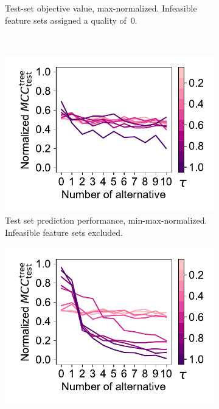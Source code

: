 \documentclass{article}
\theoremstyle{definition}
\begin{document}
\begin{figure}[p]
\begin{subfigure}[t]{0.48\textwidth}
		\caption{
			Test-set objective value, max-norma\-lized.
			Infeasible feature sets assigned a quality of~0.
		}
		\label{fig:afs:impact-num-alternatives-tau-test-objective-max-fillna}
	\end{subfigure}
	\\ \vspace{\baselineskip}
	\begin{subfigure}[t]{0.48\textwidth}
		\centering
		\includegraphics[width=\textwidth, trim=15 15 10 15, clip]{plots/afs-impact-num-alternatives-tau-decision-tree-test-mcc-min-max.pdf}
		\caption{
			Test set prediction performance, min-max-normalized.
			Infeasible feature sets excluded.
		}
		\label{fig:afs:impact-num-alternatives-tau-decision-tree-test-mcc-min-max}
	\end{subfigure}
	\hfill
	\begin{subfigure}[t]{0.48\textwidth}
		\centering
		\includegraphics[width=\textwidth, trim=15 15 10 15, clip]{plots/afs-impact-num-alternatives-tau-decision-tree-test-mcc-min-max-fillna.pdf}

\end{subfigure}
\end{figure}
\end{document}
